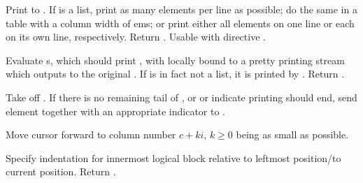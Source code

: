 \begin{LIST}{1cm}
  {
    Print  to . If  is a list, print as
    many elements per line as possible; do the same in a table with
    a column width of  ems; or print either all elements on
    one line or each on its own line, respectively. Return
    \retval{\NIL}. Usable with  directive \KWD{\TLD//}.
  }

  {
    Evaluate s, which should print , with
     locally bound to a pretty 
    printing stream which outputs to the original . If
     is in fact not a list, it is printed by
    . Return \retval{\NIL}.
  }

  \begin{LIST}{.5cm}

    {
      Take  off . If there is no remaining
      tail of , or  or  indicate
      printing should end, send element together with an appropriate
      indicator to . 
    }

    {
      Move cursor forward to column number $c + ki$, $k \geq 0$ being as small
      as possible.
    }
    
    {
      Specify indentation for innermost logical block relative to
      leftmost position/to current position. Return \retval{\NIL}.
    }
    

\end{LIST}
\end{LIST}
